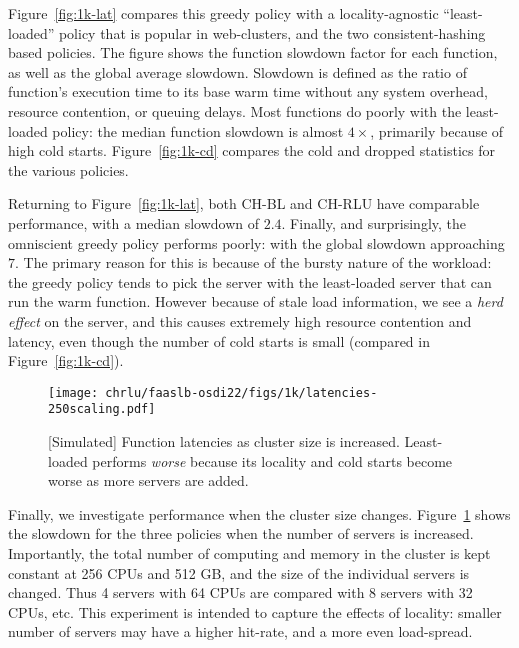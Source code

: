 Figure~\ref{fig:1k-lat} compares this greedy policy with a locality-agnostic ``least-loaded'' policy that is popular in web-clusters, and the two consistent-hashing based policies. 
The figure shows the function slowdown factor for each function, as well as the global average slowdown.
Slowdown is defined as the ratio of function's execution time to its base warm time without any system overhead, resource contention, or queuing delays.
Most functions do poorly with the least-loaded policy: the median function slowdown is almost $4\times$, primarily because of high cold starts.
Figure~\ref{fig:1k-cd} compares the cold and dropped statistics for the various policies.

Returning to Figure~\ref{fig:1k-lat}, both CH-BL and CH-RLU have comparable performance, with a median slowdown of $2.4$. 
Finally, and surprisingly, the omniscient greedy policy performs poorly: with the global slowdown approaching $7$.
The primary reason for this is because of the bursty nature of the workload: the greedy policy tends to pick the server with the least-loaded server that can run the warm function.
However because of stale load information, we see a \emph{herd effect} on the server, and this causes extremely high resource contention and latency, even though the number of cold starts is small (compared in Figure~\ref{fig:1k-cd}). 



\begin{figure}
  \centering
  \texttt{[image: chrlu/faaslb-osdi22/figs/1k/latencies-250scaling.pdf]}
  \caption{[Simulated] Function latencies as cluster size is increased. Least-loaded performs \emph{worse} because its locality and cold starts become worse as more servers are added.}
  \label{fig:1k-scaling}
\end{figure}


Finally, we investigate performance when the cluster size changes.
Figure~\ref{fig:1k-scaling} shows the slowdown for the three policies when the number of servers is increased.
Importantly, the total number of computing and memory in the cluster is kept constant at 256 CPUs and 512 GB, and the size of the individual servers is changed.
Thus 4 servers with 64 CPUs are compared with 8 servers with 32 CPUs, etc.
This experiment is intended to capture the effects of locality: smaller number of servers may have a higher hit-rate, and a more even load-spread.

